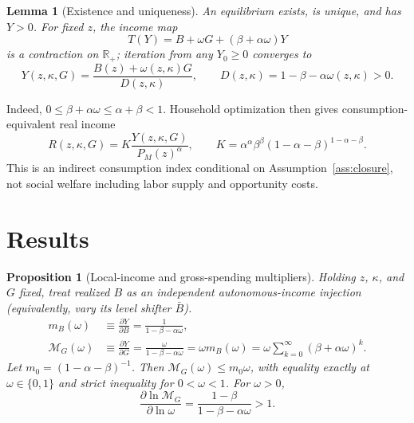 \documentclass[11pt]{article}
\theoremstyle{plain}
\newtheorem{lemma}{Lemma}
\newtheorem{proposition}{Proposition}
\theoremstyle{definition}
\begin{document}
\begin{lemma}[Existence and uniqueness]
\label{lem:equilibrium}
An equilibrium exists, is unique, and has \(Y>0\). For fixed \(z\), the income
map
\[
 T(Y)=B+\omega G+(\beta+\alpha\omega)Y
\]
is a contraction on \(\mathbb R_+\); iteration from any \(Y_0\geq0\) converges
to
\begin{equation}
 Y(z,\kappa,G)=\frac{B(z)+\omega(z,\kappa)G}{D(z,\kappa)},\qquad
 D(z,\kappa)=1-\beta-\alpha\omega(z,\kappa)>0.
 \label{eq:income-solution}
\end{equation}
\end{lemma}

Indeed, \(0\leq\beta+\alpha\omega\leq\alpha+\beta<1\).
Household optimization then gives consumption-equivalent real income
\begin{equation}
 R(z,\kappa,G)=K\frac{Y(z,\kappa,G)}{P_M(z)^\alpha},\qquad
 K=\alpha^\alpha\beta^\beta
 (1-\alpha-\beta)^{1-\alpha-\beta}.
 \label{eq:real-income}
\end{equation}
This is an indirect consumption index conditional on Assumption~\ref{ass:closure},
not social welfare including labor supply and opportunity costs.

\section{Results}
\label{sec:results}

\begin{proposition}[Local-income and gross-spending multipliers]
\label{prop:multiplier}
Holding \(z\), \(\kappa\), and \(G\) fixed, treat realized \(B\) as an
independent autonomous-income injection (equivalently, vary its level shifter
\(\bar B\)).
\begin{align}
 m_B(\omega)&\equiv\frac{\partial Y}{\partial B}
 =\frac{1}{1-\beta-\alpha\omega},
 \label{eq:local-income-multiplier}\\
 \mathcal M_G(\omega)&\equiv\frac{\partial Y}{\partial G}
 =\frac{\omega}{1-\beta-\alpha\omega}
 =\omega m_B(\omega)
 =\omega\sum_{k=0}^{\infty}(\beta+\alpha\omega)^k.
 \label{eq:recursive-multiplier}
\end{align}
Let \(m_0=(1-\alpha-\beta)^{-1}\). Then
\(\mathcal M_G(\omega)\leq m_0\omega\), with equality exactly at
\(\omega\in\{0,1\}\) and strict inequality for \(0<\omega<1\). For
\(\omega>0\),
\begin{equation}
 \frac{\partial\ln\mathcal M_G}{\partial\ln\omega}
 =\frac{1-\beta}{1-\beta-\alpha\omega}>1.
 \label{eq:retention-elasticity}
\end{equation}
\end{proposition}
\end{document}
